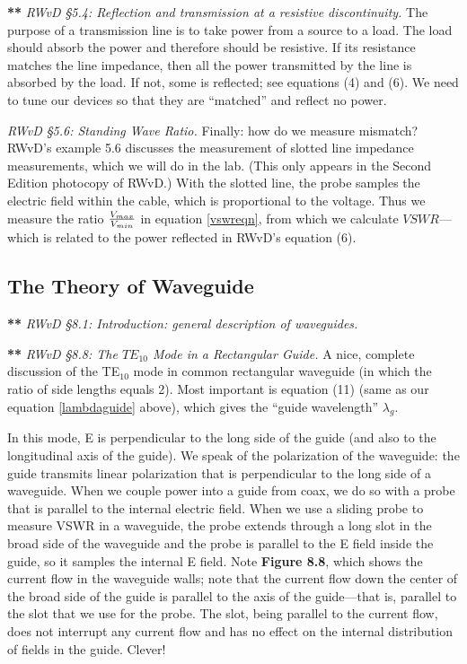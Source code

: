 \documentclass[preprint]{aastex}
\begin{document}
{\bf ***} {\it RWvD \S 5.4: Reflection and transmission at a resistive
discontinuity.} The purpose of a transmission line is to take power from
a source to a load. The load should absorb the power and therefore
should be resistive. If its resistance matches the line impedance, then
all the power transmitted by the line is absorbed by the load. If not,
some is reflected; see equations (4) and (6). We need to tune our
devices so that they are ``matched'' and reflect no power. 

          {\it RWvD \S 5.6: Standing Wave Ratio.} Finally: how do we
measure mismatch? RWvD's example 5.6 discusses the measurement of
slotted line impedance measurements, which we will do in the lab.  (This
only appears in the Second Edition photocopy of RWvD.) With the slotted
line, the probe samples the electric field within the cable, which is
proportional to the voltage.  Thus we measure the ratio $V_{max} \over
V_{min}$ in equation \ref{vswreqn}, from which we calculate
$VSWR$---which is related to the power reflected in RWvD's equation (6). 

\subsection{The Theory of Waveguide}
          
{\bf ***} {\it RWvD \S 8.1:  Introduction: general description of
waveguides.} 

{\bf ***} {\it RWvD \S 8.8:  The $TE_{10}$ Mode in a Rectangular
Guide.} A nice, complete discussion of the TE$_{10}$ mode in common
rectangular waveguide (in which the ratio of side lengths equals 2). 
Most important is equation (11) (same as our equation \ref{lambdaguide}
above), which gives the ``guide wavelength'' $\lambda_g$. 

          In this mode, E is perpendicular to the long side of the guide
(and also to the longitudinal axis of the guide).  We speak of the
polarization of the waveguide: the guide transmits linear polarization
that is perpendicular to the long side of a waveguide.  When we couple
power into a guide from coax, we do so with a probe that is parallel to
the internal electric field.  When we use a sliding probe to measure
VSWR in a waveguide, the probe extends through a long slot in the broad
side of the waveguide and the probe is parallel to the E field inside
the guide, so it samples the internal E field.  Note {\bf Figure 8.8},
which shows the current flow in the waveguide walls; note that the
current flow down the center of the broad side of the guide is parallel
to the axis of the guide---that is, parallel to the slot that we use for
the probe.  The slot, being parallel to the current flow, does not
interrupt any current flow and has no effect on the internal
distribution of fields in the guide.  Clever!
\end{document}
